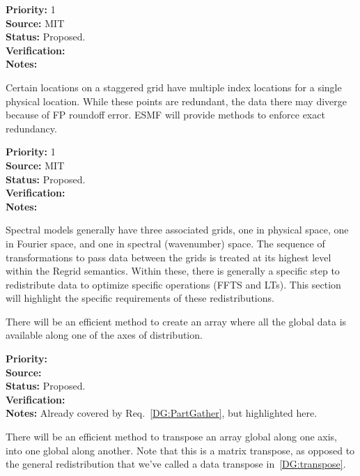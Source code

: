 \begin{reqlist}
{\bf Priority:} 1 \\ 
{\bf Source:} MIT \\
{\bf Status:} Proposed. \\
{\bf Verification:} \\
{\bf Notes:}
\end{reqlist}


Certain locations on a staggered grid have multiple index locations
for a single physical location. While these points are redundant, the
data there may diverge because of FP roundoff error. ESMF will provide
methods to enforce exact redundancy.

\begin{reqlist}
{\bf Priority:} 1 \\ 
{\bf Source:} MIT \\
{\bf Status:} Proposed. \\
{\bf Verification:} \\
{\bf Notes:}
\end{reqlist}


Spectral models generally have three associated grids, one in physical
space, one in Fourier space, and one in spectral (wavenumber) space. The sequence of
transformations to pass data between the grids is treated at its
highest level within the Regrid semantics. Within these, there is
generally a specific step to redistribute data to optimize specific
operations (FFTS and LTs). This section will highlight the specific
requirements of these redistributions.


There will be an efficient method to create an array where all the
global data is available along one of the axes of distribution.

\begin{reqlist}
{\bf Priority:} \\
{\bf Source:} \\
{\bf Status:} Proposed. \\
{\bf Verification:} \\
{\bf Notes:} Already covered by Req.~\ref{DG:PartGather}, but
  highlighted here.
\end{reqlist}


There will be an efficient method to transpose an array global along
one axis, into one global along another. Note that this is a matrix
transpose, as opposed to the general redistribution that we've called
a data transpose in~\ref{DG:transpose}.

